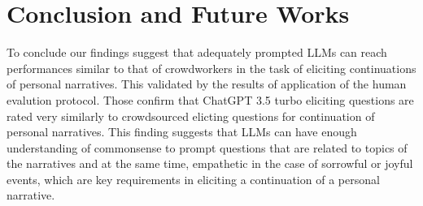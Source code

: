 \chapter{Conclusion and Future Works}
\label{cha:conclusion}
To conclude our findings suggest that adequately prompted LLMs can reach performances similar to that of crowdworkers in the task of eliciting continuations of personal narratives. This validated by the results of application of the human evalution protocol. Those confirm that ChatGPT 3.5 turbo eliciting questions are rated very similarly to crowdsourced elicting questions for continuation of personal narratives. This finding suggests that LLMs can have enough understanding of commonsense to prompt questions that are related to topics of the narratives and at the same time, empathetic in the case of sorrowful or joyful events, which are key requirements in eliciting a continuation of a personal narrative.


